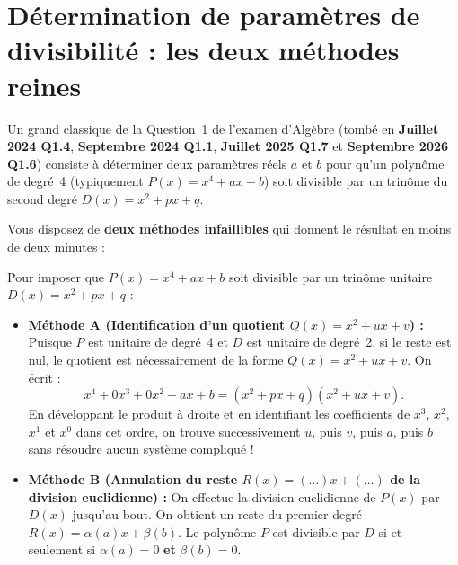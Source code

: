 \section{Détermination de paramètres de divisibilité : les deux méthodes reines}

Un grand classique de la Question~1 de l'examen d'Algèbre (tombé en \textbf{Juillet 2024 Q1.4}, \textbf{Septembre 2024 Q1.1}, \textbf{Juillet 2025 Q1.7} et \textbf{Septembre 2026 Q1.6}) consiste à déterminer deux paramètres réels $a$ et $b$ pour qu'un polynôme de degré~4 (typiquement $P(x) = x^4 + ax + b$) soit divisible par un trinôme du second degré $D(x) = x^2 + px + q$.

Vous disposez de \textbf{deux méthodes infaillibles} qui donnent le résultat en moins de deux minutes :

\begin{theoreme}
Pour imposer que $P(x) = x^4 + ax + b$ soit divisible par un trinôme unitaire $D(x) = x^2 + px + q$ :
\begin{itemize}
    \item \textbf{Méthode A (Identification d'un quotient $Q(x) = x^2 + ux + v$) :} Puisque $P$ est unitaire de degré~4 et $D$ est unitaire de degré~2, si le reste est nul, le quotient est nécessairement de la forme $Q(x) = x^2 + ux + v$. On écrit :
    \[
        x^4 + 0x^3 + 0x^2 + ax + b = (x^2 + px + q)(x^2 + ux + v).
    \]
    En développant le produit à droite et en identifiant les coefficients de $x^3$, $x^2$, $x^1$ et $x^0$ dans cet ordre, on trouve successivement $u$, puis $v$, puis $a$, puis $b$ sans résoudre aucun système compliqué !
    \item \textbf{Méthode B (Annulation du reste $R(x) = (\dots)x + (\dots)$ de la division euclidienne) :} On effectue la division euclidienne de $P(x)$ par $D(x)$ jusqu'au bout. On obtient un reste du premier degré $R(x) = \alpha(a) x + \beta(b)$. Le polynôme $P$ est divisible par $D$ si et seulement si $\alpha(a) = 0$ \textbf{et} $\beta(b) = 0$.
\end{itemize}
\end{theoreme}

